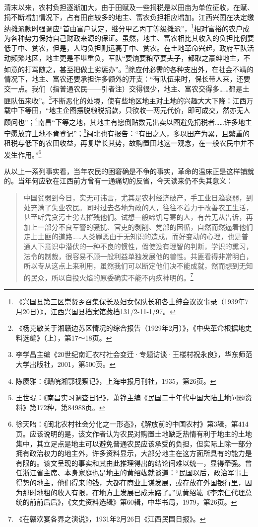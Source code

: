 清末以来，农村负担逐渐加大，由于田赋及一些捐税是以田亩为单位征收，在赋、捐不断增加情况下，占有田亩较多的地主、富农负担相应增加。江西兴国在决定缴纳摊派款时强调应“首由富户认定，继分甲乙丙丁等级摊派”，\footnote{《兴国县第三区崇贤乡召集保长及妇女保队长和各士绅会议议事录（1939年7月20日）》，江西兴国县档案馆藏档131/2-11-1/97。}相对富裕的农户成为各种势力保持自己财政来源的保证。虽然，地主、富农相比其收入的负担比例要低于中、贫农，但是，人均负担则远高于中、贫农。在土地革命兴起，政府军队活动频繁地区，地主更是不堪重负，军队“要饷要粮草要夫子，都取之豪绅地主，不如意的打骂随之，甚至把做土劣惩办”。\footnote{《杨克敏关于湘赣边苏区情况的综合报告（1929年2月）》，《中央革命根据地史料选编》（上），第17～18页。}除应付必需的各种支出外，在社会不靖的情况下，地主、富农还要承担许多额外的开支：“有队伍来时，保长带人来，还要交一点。我们（指普通农民——引者注）交得很少，地主、富农交得多……都是土匪队伍来收”。\footnote{李学昌主编《20世纪南汇农村社会变迁·专题访谈·王楼村祝永良》，华东师范大学出版社，2001，第500页。}不断恶化的处境，使有些地区地主对土地的兴趣大大下降：江西万载中下等田，“地主企图摆脱粮税捐款，只欲收一两元代价，即可成交，然亦无人顾问也”；\footnote{陈赓雅：《赣皖湘鄂视察记》，上海申报月刊社，1935，第26页。}南昌“下等之地，其地主有愿倒贴数元出卖以图避免捐税者……许多地主宁愿放弃土地不肯登记”；\footnote{王世琨：《南昌实习调查日记》，萧铮主编《民国二十年代中国大陆土地问题资料》第172种，第84988页。}闽北也有报告：“有田之人，多以田产为累，且繁重的租税与低下的农田收益，再复增长其势，故购置田地这一观念，在一般农民中并不发生作用。”\footnote{徐天眙：《闽北农村社会分化之一形态》，《解放前的中国农村》第3辑，第414页。应该说明的是，该文作者认为农民对购置土地缺乏热情有利于地主的土地集中，其立足点是地主可以避免普通农民应该承受的负担，但实际上除一部分拥有政治权力的地主外，许多资料显示，大部分地主在这方面所具有的能力是有限的。该文呈现的事实和其由此推理得出的结论间难以统一，显得牵强。曾任浙江省主席、本身家庭也是地主的黄绍竑就谈道：“民国以后，政治军事上得势的地主，他们得来的钱，大都在商业上谋发展，或存放在外国银行里，因为那时地租的收入有限，在地方上发展已成末路了。”见黄绍竑《李宗仁代理总统的前前后后》，《文史资料选辑》第60辑，中华书局，1979，第26页。}


从以上一系列事实看，当年农民的困窘确是不争的事实，革命的温床正是这样铺就的。当年何应钦在江西前方曾有一通痛切的反省，今天读来仍不失其意义：

\begin{quote}

中国贫弱到今日，实无可讳言，尤其是农村经济破产，手工业日趋衰弱，到处充满了失业农民。同时过去各地为政的人，往往不着力于改善农工生活，甚至听凭贪污土劣去摧残他们。试想一般啼饥号寒的人，有苦无从告诉，再加上一部分不良军警的骚扰、官吏的剥削、党部的因循，自然而然逼着他们走上土匪的道路……人类罪恶由于无知识的造成，而好变动的心理，也是普通人下意识中潜伏的一种不良的惯性，假使没有理智的判断，学识的熏习，法令的制裁，很容易不顾一般利益单独发展他的兽性。共匪看得非常明白，所以专从这点上来利用，虽然我们可以断定他们决不能成就，然而想到无知的民众，所以自投火焰的原委确实不能不内疚神明的。\footnote{《在赣欢宴各界之演说》，1931年2月26日《江西民国日报》。}
\end{quote}


